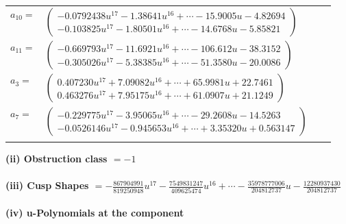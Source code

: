\documentclass[1p]{elsarticle_modified}
\theoremstyle{definition}
\begin{document}
\begin{tabular}{m{7pt} m{180pt} m{7pt} m{180pt} }
\flushright $a_{10}=$&$\begin{pmatrix}-0.0792438 u^{17}-1.38641 u^{16}+\cdots-15.9005 u-4.82694\\-0.103825 u^{17}-1.80501 u^{16}+\cdots-14.6768 u-5.85821\end{pmatrix}$ \\
\flushright $a_{11}=$&$\begin{pmatrix}-0.669793 u^{17}-11.6921 u^{16}+\cdots-106.612 u-38.3152\\-0.305026 u^{17}-5.38385 u^{16}+\cdots-51.3580 u-20.0086\end{pmatrix}$ \\
\flushright $a_{3}=$&$\begin{pmatrix}0.407230 u^{17}+7.09082 u^{16}+\cdots+65.9981 u+22.7461\\0.463276 u^{17}+7.95175 u^{16}+\cdots+61.0907 u+21.1249\end{pmatrix}$ \\
\flushright $a_{7}=$&$\begin{pmatrix}-0.229775 u^{17}-3.95065 u^{16}+\cdots-29.2608 u-14.5263\\-0.0526146 u^{17}-0.945653 u^{16}+\cdots+3.35320 u+0.563147\end{pmatrix}$\\&\end{tabular}
\flushleft \textbf{(ii) Obstruction class $= -1$}\\~\\
\flushleft \textbf{(iii) Cusp Shapes $= -\frac{867904991}{819250948} u^{17}-\frac{7549831247}{409625474} u^{16}+\cdots-\frac{35978777006}{204812737} u-\frac{12280937430}{204812737}$}\\~\\
\newpage\renewcommand{\arraystretch}{1}
\flushleft \textbf{(iv) u-Polynomials at the component}\newline \\
\end{document}
